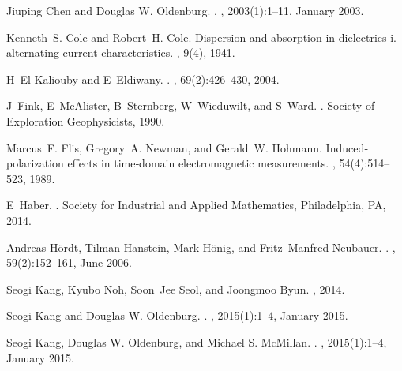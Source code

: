 \documentclass[extra,mreferee]{gji}
\begin{document}
\begin{thebibliography}{}

Jiuping Chen and Douglas {W. Oldenburg}.
.
, 2003(1):1--11, January 2003.

Kenneth~S. Cole and Robert~H. Cole.
\newblock Dispersion and absorption in dielectrics i. alternating current
  characteristics.
, 9(4), 1941.

H~El‐Kaliouby and E~Eldiwany.
.
, 69(2):426--430, 2004.

J~Fink, E~McAlister, B~Sternberg, W~Wieduwilt, and S~Ward.
.
\newblock Society of Exploration Geophysicists, 1990.

Marcus~F. Flis, Gregory~A. Newman, and Gerald~W. Hohmann.
\newblock Induced‐polarization effects in time‐domain electromagnetic
  measurements.
, 54(4):514--523, 1989.

E~Haber.
.
\newblock Society for Industrial and Applied Mathematics, Philadelphia, PA,
  2014.

Andreas H\"{o}rdt, Tilman Hanstein, Mark H\"{o}nig, and Fritz~Manfred Neubauer.
.
, 59(2):152--161, June 2006.

Seogi Kang, Kyubo Noh, Soon~Jee Seol, and Joongmoo Byun.
, 2014.

Seogi Kang and Douglas {W. Oldenburg}.
.
, 2015(1):1--4, January 2015.

Seogi Kang, Douglas {W. Oldenburg}, and Michael {S. McMillan}.
.
, 2015(1):1--4, January 2015.


\end{thebibliography}
\end{document}

